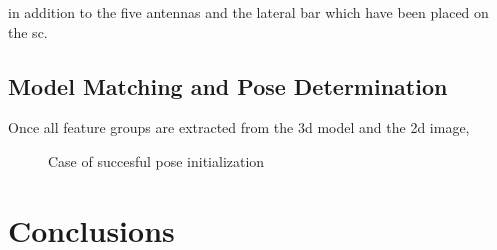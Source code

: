 in addition to the five antennas and the lateral bar which have been placed on the \acrshort{sc}.

\subsection{Model Matching and Pose Determination}
Once all feature groups are extracted from the \acrshort{3d} model and the \acrshort{2d} image, 

\begin{figure}[htbp]
  \centering
  \qquad
  \qquad
  \caption{Case of succesful pose initialization}
  \label{fig:EVVAI}
\end{figure}

\section{Conclusions}

